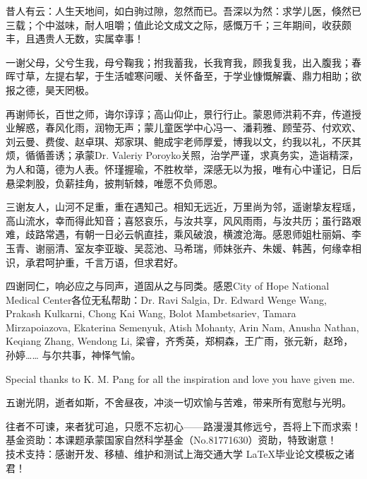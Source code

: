 \begin{thanks}
  昔人有云：人生天地间，如白驹过隙，忽然而已。吾深以为然：求学儿医，倏然已三载；个中滋味，耐人咀嚼；值此论文成文之际，感慨万千；三年期间，收获颇丰，且遇贵人无数，实属幸事！

  一谢父母，父兮生我，母兮鞠我；拊我蓄我，长我育我，顾我复我，出入腹我；春晖寸草，左提右挈，于生活嘘寒问暖、关怀备至，于学业慷慨解囊、鼎力相助；欲报之德，昊天罔极。

  再谢师长，百世之师，诲尔谆谆；高山仰止，景行行止。蒙恩师洪莉不弃，传道授业解惑，春风化雨，润物无声；蒙儿童医学中心冯一、潘莉雅、顾莹芬、付欢欢、刘云曼、费俊、赵卓琪、郑家琪、鲍成宇老师厚爱，博我以文，约我以礼，不厌其烦，循循善诱；承蒙Dr. Valeriy Poroyko关照，治学严谨，求真务实，造诣精深，为人和蔼，德为人表。怀瑾握瑜，不胜枚举，深感无以为报，唯有心中谨记，日后悬梁刺股，负薪挂角，披荆斩棘，唯愿不负师恩。

  三谢友人，山河不足重，重在遇知己。相知无远近，万里尚为邻，遥谢挚友程瑶，高山流水，幸而得此知音；喜怒哀乐，与汝共享，风风雨雨，与汝共历；虽行路艰难，歧路常遇，有朝一日必云帆直挂，乘风破浪，横渡沧海。感恩师姐杜丽娟、李玉青、谢丽清、室友李亚璇、吴蕊池、马希瑞，师妹张卉、朱媛、韩茜，何缘幸相识，承君呵护重，千言万语，但求君好。

  四谢同仁，响必应之与同声，道固从之与同类。感恩City of Hope National Medical Center各位无私帮助：Dr. Ravi Salgia, Dr. Edward Wenge Wang, Prakash Kulkarni, Chong Kai Wang, Bolot Mambetsariev, Tamara Mirzapoiazova, Ekaterina Semenyuk, Atish Mohanty, Arin Nam, Anusha Nathan, Keqiang Zhang, Wendong Li, 梁睿，齐秀英，郑桐森，王广雨，张元新，赵玲，孙婷…… 与尔共事，神怿气愉。

  Special thanks to K. M. Pang for all the inspiration and love you have given me.

  五谢光阴，逝者如斯，不舍昼夜，冲淡一切欢愉与苦难，带来所有宽慰与光明。

  往者不可谏，来者犹可追，只愿不忘初心——路漫漫其修远兮，吾将上下而求索！\\
  基金资助：本课题承蒙国家自然科学基金（No.81771630）资助，特致谢意！\\
  技术支持：感谢开发、移植、维护和测试上海交通大学 \LaTeX 毕业论文模板之诸君！\\
\end{thanks}
